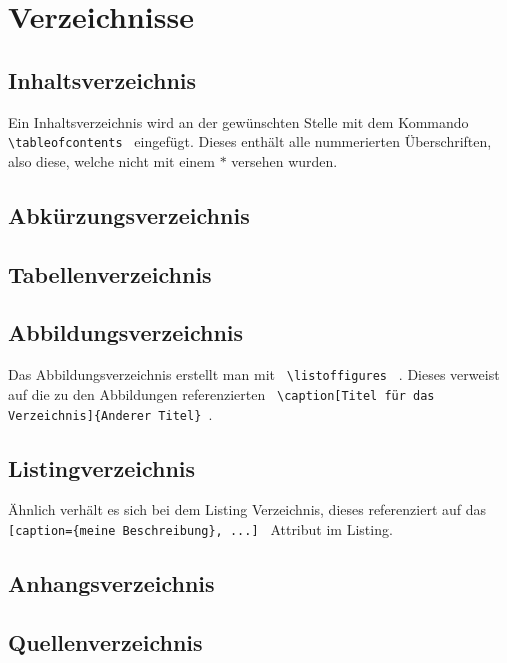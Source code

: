 \section{Verzeichnisse}
\subsection{Inhaltsverzeichnis}
Ein Inhaltsverzeichnis wird an der gewünschten Stelle mit dem Kommando 
\lstinline$ \tableofcontents $ eingefügt. Dieses enthält alle nummerierten 
Überschriften, also diese, welche nicht mit einem $*$ versehen wurden.
\subsection{Abkürzungsverzeichnis}

\subsection{Tabellenverzeichnis}


\subsection{Abbildungsverzeichnis}
Das Abbildungsverzeichnis erstellt man mit \lstinline$ \listoffigures $ . 
Dieses verweist auf die zu den Abbildungen referenzierten 
\lstinline $ \caption[Titel für das Verzeichnis]{Anderer Titel} $.
\subsection{Listingverzeichnis}
Ähnlich verhält es sich bei dem Listing Verzeichnis, dieses referenziert auf 
das \lstinline $ [caption={meine Beschreibung}, ...] $ Attribut im Listing.
\subsection{Anhangsverzeichnis}
\subsection{Quellenverzeichnis}



\listoftables %
\lstlistoflistings %